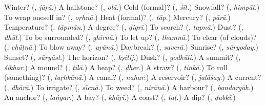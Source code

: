 \begin{tcolorbox}[breakable,colback=teal!4,colframe=teal!35!black,title={Before you move on}]
Winter? (\textbf{}, \emph{jāṛā}.) A hailstone? (\textbf{}, \emph{olā}.) Cold (formal)? (\textbf{}, \emph{śīt}.) Snowfall? (\textbf{}, \emph{himpāt}.) To wrap oneself in? (\textbf{}, \emph{oṛhnā}.) Heat (formal)? (\textbf{}, \emph{tāp}.) Mercury? (\textbf{}, \emph{pārā}.) Temperature? (\textbf{}, \emph{tāpmān}.) A degree? (\textbf{}, \emph{ḍigrī}.) To scorch? (\textbf{}, \emph{tapnā}.) Dust? (\textbf{}, \emph{dhūl}.) To be surrounded? (\textbf{}, \emph{ghirnā}.) To let up? (\textbf{}, \emph{thamnā}.) To clear (of clouds)? (\textbf{}, \emph{chãṭnā}.) To blow away? (\textbf{}, \emph{uṛānā}.) Daybreak? (\textbf{}, \emph{saverā}.) Sunrise? (\textbf{}, \emph{sūryoday}.) Sunset? (\textbf{}, \emph{sūryāst}.) The horizon? (\textbf{}, \emph{kṣitij}.) Dusk? (\textbf{}, \emph{godhūli}.) A summit? (\textbf{}, \emph{śikhar}.) A mound? (\textbf{}, \emph{ṭīlā}.) A heap? (\textbf{}, \emph{ḍher}.) A straw? (\textbf{}, \emph{tinkā}.) To roll (something)? (\textbf{}, \emph{luṛhkānā}.) A canal? (\textbf{}, \emph{nahar}.) A reservoir? (\textbf{}, \emph{jalāśay}.) A current? (\textbf{}, \emph{dhārā}.) To irrigate? (\textbf{}, \emph{sī̃cnā}.) To weed? (\textbf{}, \emph{nirānā}.) A harbour? (\textbf{}, \emph{bandargāh}.) An anchor? (\textbf{}, \emph{laṅgar}.) A bay? (\textbf{}, \emph{khāṛī}.) A coast? (\textbf{}, \emph{taṭ}.) A dip? (\textbf{}, \emph{ḍubkī}.)
\end{tcolorbox}
